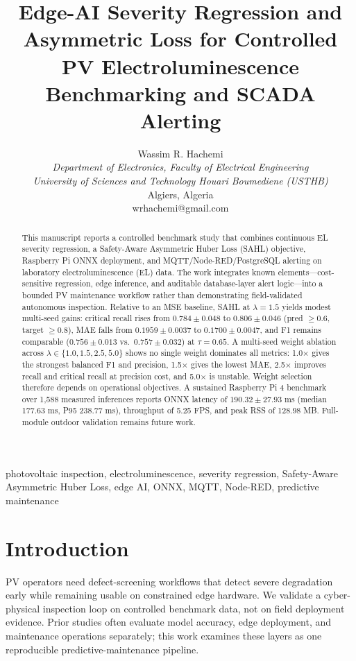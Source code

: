 \documentclass[journal]{IEEEtran}
\title{Edge-AI Severity Regression and Asymmetric Loss for Controlled PV Electroluminescence Benchmarking and SCADA Alerting}
\author{Wassim R. Hachemi\\
\textit{Department of Electronics, Faculty of Electrical Engineering}\\
\textit{University of Sciences and Technology Houari Boumediene (USTHB)}\\
Algiers, Algeria\\
wrhachemi@gmail.com}
\begin{document}
\maketitle
\thispagestyle{empty}

\begin{abstract}
This manuscript reports a controlled benchmark study that combines continuous EL severity regression, a Safety-Aware Asymmetric Huber Loss (SAHL) objective, Raspberry Pi ONNX deployment, and MQTT/Node-RED/PostgreSQL alerting on laboratory electroluminescence (EL) data. The work integrates known elements---cost-sensitive regression, edge inference, and auditable database-layer alert logic---into a bounded PV maintenance workflow rather than demonstrating field-validated autonomous inspection. Relative to an MSE baseline, SAHL at $\lambda=1.5$ yields modest multi-seed gains: critical recall rises from $0.784 \pm 0.048$ to $0.806 \pm 0.046$ (pred $\ge 0.6$, target $\ge 0.8$), MAE falls from $0.1959 \pm 0.0037$ to $0.1700 \pm 0.0047$, and F1 remains comparable ($0.756 \pm 0.013$ vs.\ $0.757 \pm 0.032$) at $\tau=0.65$. A multi-seed weight ablation across $\lambda \in \{1.0, 1.5, 2.5, 5.0\}$ shows no single weight dominates all metrics: 1.0$\times$ gives the strongest balanced F1 and precision, 1.5$\times$ gives the lowest MAE, 2.5$\times$ improves recall and critical recall at precision cost, and 5.0$\times$ is unstable. Weight selection therefore depends on operational objectives. A sustained Raspberry Pi 4 benchmark over 1,588 measured inferences reports ONNX latency of $190.32 \pm 27.93$ ms (median 177.63 ms, P95 238.77 ms), throughput of 5.25 FPS, and peak RSS of 128.98 MB. Full-module outdoor validation remains future work.
\end{abstract}

\begin{IEEEkeywords}
photovoltaic inspection, electroluminescence, severity regression, Safety-Aware Asymmetric Huber Loss, edge AI, ONNX, MQTT, Node-RED, predictive maintenance
\end{IEEEkeywords}

\section{Introduction}
PV operators need defect-screening workflows that detect severe degradation early while remaining usable on constrained edge hardware. We validate a cyber-physical inspection loop on controlled benchmark data, not on field deployment evidence.
Prior studies often evaluate model accuracy, edge deployment, and maintenance operations separately; this work examines these layers as one reproducible predictive-maintenance pipeline.
\end{document}
